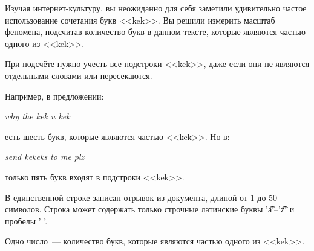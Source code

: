 Изучая интернет-культуру, вы неожиданно для себя заметили удивительно частое
использование сочетания букв <<kek>>. Вы решили
измерить масштаб феномена, подсчитав количество букв в данном тексте, которые
являются частью одного из <<kek>>.

При подсчёте нужно учесть все подстроки <<kek>>, даже если они не являются
отдельными словами или пересекаются.

Например, в предложении:

\textit{why the kek u kek}

есть шесть букв, которые являются частью <<kek>>. Но в:

\textit{send kekeks to me plz}

только пять букв входят в подстроки <<kek>>.

\InputFile

В единственной строке записан отрывок из документа, длиной от 1 до 50 символов.
Строка может содержать только строчные латинские буквы '\t{a}'--'\t{z}' и пробелы ' '.

\OutputFile

Одно число~--- количество букв, которые являются частью одного из <<kek>>.

\SAMPLES
